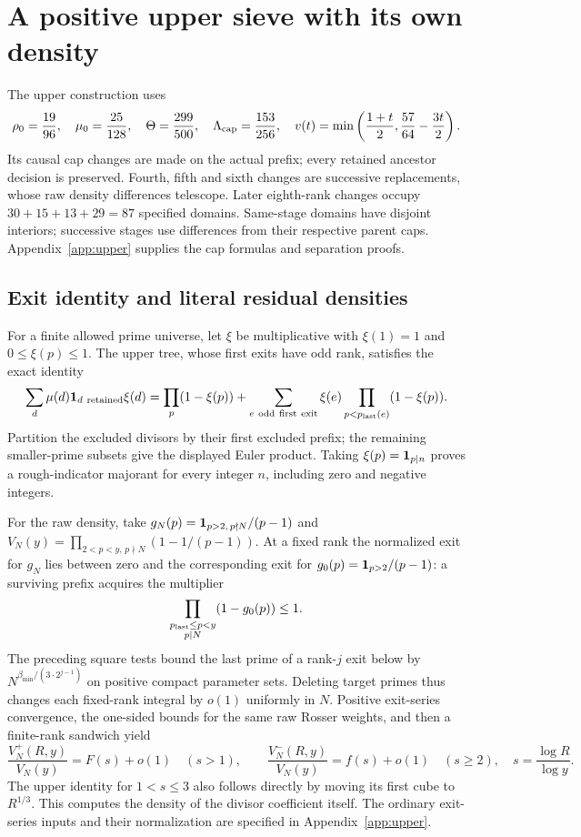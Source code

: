\section{A positive upper sieve with its own density}
\label{sec:current-upper}

The upper construction uses
\[
 \rho_0=\frac{19}{96},\quad \mu_0=\frac{25}{128},\quad
 \Theta=\frac{299}{500},\quad \Lambda_{\rm cap}=\frac{153}{256},\quad
 v(t)=\min\left(\frac{1+t}{2},\frac{57}{64}-\frac{3t}{2}\right).
\]
Its causal cap changes are made on the actual prefix; every retained
ancestor decision is preserved.  Fourth, fifth and sixth changes are
successive replacements, whose raw density differences telescope.
Later eighth-rank changes occupy $30+15+13+29=87$ specified domains.
Same-stage domains have disjoint interiors; successive stages use
differences from their respective parent caps.  
Appendix~\ref{app:upper} supplies the cap formulas and separation proofs.

\subsection{Exit identity and literal residual densities}

For a finite allowed prime universe, let $\xi$ be multiplicative with
$\xi(1)=1$ and $0\le \xi(p)\le1$. The upper
tree, whose first exits have odd rank, satisfies the exact identity
\begin{equation}
 \sum_d\mu(d){\mathbf 1}_{d\ {\rm retained}}\xi(d)
 =\prod_p(1-\xi(p))
   +\sum_{e\ {\rm odd\ first\ exit}}\xi(e)
                      \prod_{p<p_{\rm last}(e)}(1-\xi(p)).
 \label{eq:current-upper-exit}
\end{equation}
Partition the excluded divisors by their first excluded prefix; the
remaining smaller-prime subsets give the displayed Euler product.
Taking $\xi(p)={\mathbf 1}_{p\mid n}$ proves a rough-indicator majorant for
every integer $n$, including zero and negative integers.

For the raw density, take
$g_N(p)={\mathbf 1}_{p>2,\,p\nmid N}/(p-1)$ and
$V_N(y)=\prod_{2<p<y,\,p\nmid N}(1-1/(p-1))$.
At a fixed rank the normalized exit for $g_N$ lies between zero and
the corresponding exit for $g_0(p)={\mathbf 1}_{p>2}/(p-1)$: a surviving
prefix acquires the multiplier
\[
 \prod_{\substack{p_{\rm last}\le p<y\\p\mid N}}(1-g_0(p))\le1.
\]
The preceding square tests bound the last prime of a rank-$j$ exit
below by $N^{\beta_{\min}/(3\cdot2^{j-1})}$ on positive compact
parameter sets.  Deleting target primes thus changes each fixed-rank
integral by $o(1)$ uniformly in $N$.  Positive exit-series convergence,
the one-sided bounds for the same raw Rosser weights, and then a
finite-rank sandwich yield
\begin{equation}
 \frac{V_N^+(R,y)}{V_N(y)}=F(s)+o(1)\quad(s>1),\qquad
 \frac{V_N^-(R,y)}{V_N(y)}=f(s)+o(1)\quad(s\ge2),
 \quad s=\frac{\log R}{\log y}.
 \label{eq:current-raw-density}
\end{equation}
The upper identity for $1<s\le3$ also follows directly by moving its
first cube to $R^{1/3}$.  This computes the density of the divisor coefficient itself.  The ordinary exit-series inputs and their normalization are
specified in Appendix~\ref{app:upper}.

